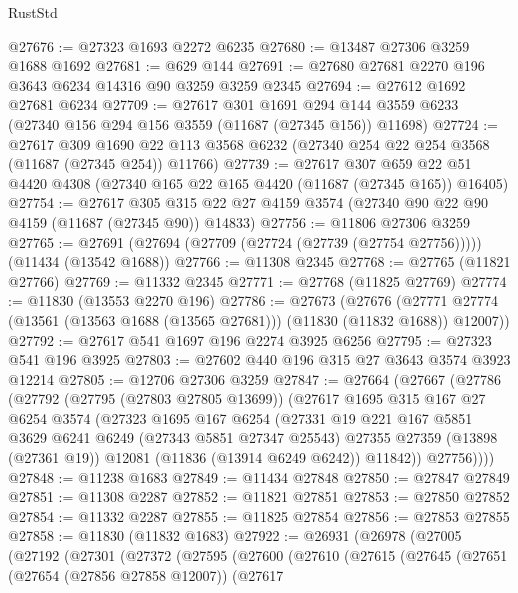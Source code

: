 \begin{lexlean}{RustStd}
\begin{coremodule}
@27676 := @27323 @1693 @2272 @6235
@27680 := @13487 @27306 @3259 @1688 @1692
@27681 := @629 @144
@27691 := @27680 @27681 @2270 @196 @3643 @6234 @14316 @90 @3259 @3259 @2345
@27694 := @27612 @1692 @27681 @6234
@27709 := @27617
    @301
    @1691
    @294
    @144
    @3559
    @6233
    (@27340 @156 @294 @156 @3559 (@11687 (@27345 @156)) @11698)
@27724 := @27617
    @309
    @1690
    @22
    @113
    @3568
    @6232
    (@27340 @254 @22 @254 @3568 (@11687 (@27345 @254)) @11766)
@27739 := @27617
    @307
    @659
    @22
    @51
    @4420
    @4308
    (@27340 @165 @22 @165 @4420 (@11687 (@27345 @165)) @16405)
@27754 := @27617
    @305
    @315
    @22
    @27
    @4159
    @3574
    (@27340 @90 @22 @90 @4159 (@11687 (@27345 @90)) @14833)
@27756 := @11806 @27306 @3259
@27765 := @27691 (@27694 (@27709 (@27724 (@27739 (@27754 @27756))))) (@11434 (@13542 @1688))
@27766 := @11308 @2345
@27768 := @27765 (@11821 @27766)
@27769 := @11332 @2345
@27771 := @27768 (@11825 @27769)
@27774 := @11830 (@13553 @2270 @196)
@27786 := @27673
    (@27676 (@27771 @27774 (@13561 (@13563 @1688 (@13565 @27681))) (@11830 (@11832 @1688)) @12007))
@27792 := @27617 @541 @1697 @196 @2274 @3925 @6256
@27795 := @27323 @541 @196 @3925
@27803 := @27602 @440 @196 @315 @27 @3643 @3574 @3923 @12214
@27805 := @12706 @27306 @3259
@27847 := @27664
    (@27667
      (@27786
        (@27792
          (@27795 (@27803 @27805 @13699))
          (@27617
            @1695
            @315
            @167
            @27
            @6254
            @3574
            (@27323
              @1695
              @167
              @6254
              (@27331
                @19
                @221
                @167
                @5851
                @3629
                @6241
                @6249
                (@27343 @5851 @27347 @25543)
                @27355
                @27359
                (@13898 (@27361 @19))
                @12081
                (@11836 (@13914 @6249 @6242))
                @11842))
            @27756))))
@27848 := @11238 @1683
@27849 := @11434 @27848
@27850 := @27847 @27849
@27851 := @11308 @2287
@27852 := @11821 @27851
@27853 := @27850 @27852
@27854 := @11332 @2287
@27855 := @11825 @27854
@27856 := @27853 @27855
@27858 := @11830 (@11832 @1683)
@27922 := @26931
    (@26978
      (@27005
        (@27192
          (@27301
            (@27372
              (@27595
                (@27600
                  (@27610
                    (@27615
                      (@27645
                        (@27651
                          (@27654 (@27856 @27858 @12007))
                          (@27617

\end{coremodule}
\end{lexlean}
